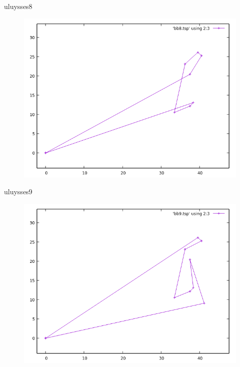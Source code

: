 \documentclass{beamer}
\begin{document}
\begin{frame}[fragile]{uluysses8}
\begin{figure}[H]
\centering
\includegraphics[scale=0.5]{bb8.png}
\end{figure}
\end{frame}

\begin{frame}[fragile]{uluysses9}
\begin{figure}[H]
\centering
\includegraphics[scale=0.5]{bb9.png}
\end{figure}
\end{frame}
\end{document}
